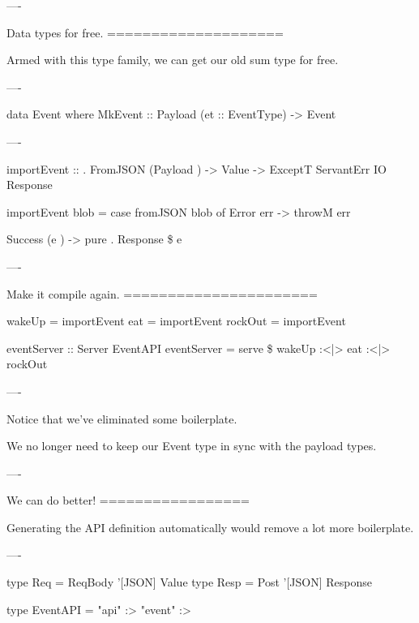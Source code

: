 ----

Data types for free.
====================

Armed with this type family, we can get our old sum type for free.

----

\begin{hs}

  data Event where
    MkEvent :: Payload (et :: EventType) -> Event
\end{hs}

----

\begin{raw}

  importEvent :: 
               . FromJSON (Payload )
              -> Value
              -> ExceptT ServantErr IO Response

  importEvent blob =
    case fromJSON blob of
      Error err ->
        throwM err

      Success (e ) ->
        pure . Response \$  e
\end{raw}

----

Make it compile again.
======================

\begin{raw}

  wakeUp  = importEvent 
  eat     = importEvent 
  rockOut = importEvent 

  eventServer :: Server EventAPI
  eventServer = serve \$
    wakeUp :<|> eat :<|> rockOut
\end{raw}

----

Notice that we've eliminated some boilerplate.

We no longer need to keep our Event type in sync with the payload types.

----

We can do better!
=================

Generating the API definition automatically would remove a lot more boilerplate.

----

\begin{raw}
  type Req  = ReqBody '[JSON] Value
  type Resp = Post    '[JSON] Response

  type EventAPI = "api" :> "event" :>
\end{raw}

